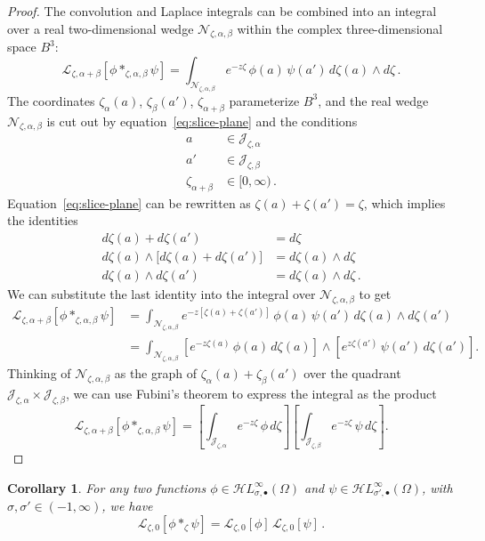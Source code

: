 \documentclass{article}
\newcommand{\singexp}[2]{\mathcal{H}L^\infty_{#1, #2}}
\newcommand{\singexpalg}[1]{\singexp{#1}{\bullet}}
\newcommand{\laplace}{\mathcal{L}}
\theoremstyle{definition}
\theoremstyle{plain}
\newtheorem{corollary}[theorem]{Corollary}
\begin{document}
\begin{proof}
The convolution and Laplace integrals can be combined into an integral over a real two-dimensional wedge $\mathcal{N}_{\zeta, \alpha, \beta}$ within the complex three-dimensional space $B^3$:
\[ \laplace_{\zeta,\alpha+\beta}[{\phi}\ast_{\zeta, \alpha,\beta}{\psi}] = \int_{\mathcal{N}_{\zeta, \alpha, \beta}} e^{-z\zeta}\,\phi(a)\, \psi(a')\,d\zeta(a) \wedge d\zeta\,. \]
The coordinates $\zeta_\alpha(a)$, $\zeta_\beta(a')$, $\zeta_{\alpha+\beta}$ parameterize $B^3$, and the real wedge $\mathcal{N}_{\zeta, \alpha, \beta}$ is cut out by equation~\eqref{eq:slice-plane} and the conditions
\begin{align*}
a & \in \mathcal{J}_{\zeta, \alpha} \\
a' & \in \mathcal{J}_{\zeta, \beta} \\
\zeta_{\alpha+\beta} & \in [0, \infty)\,.
\end{align*}
Equation~\eqref{eq:slice-plane} can be rewritten as $\zeta(a) + \zeta(a') = \zeta$, which implies the identities
\begin{align*}
d\zeta(a) + d\zeta(a') & = d\zeta \\
d\zeta(a) \wedge \big[d\zeta(a) + d\zeta(a')\big] & = d\zeta(a) \wedge d\zeta \\
d\zeta(a) \wedge d\zeta(a') & = d\zeta(a) \wedge d\zeta\,.
\end{align*}
We can substitute the last identity into the integral over $\mathcal{N}_{\zeta, \alpha, \beta}$ to get
\begin{align*}
\laplace_{\zeta,\alpha+\beta}[{\phi}\ast_{\zeta, \alpha,\beta}{\psi}] & = \int_{\mathcal{N}_{\zeta, \alpha, \beta}} e^{-z[\zeta(a) + \zeta(a')]}\,\phi(a)\, \psi(a')\,d\zeta(a) \wedge d\zeta(a') \\
& = \int_{\mathcal{N}_{\zeta, \alpha, \beta}} \left[ e^{-z\zeta(a)}\,\phi(a)\,d\zeta(a) \right] \wedge \left[ e^{z\zeta(a')}\,\psi(a')\,d\zeta(a') \right].
\end{align*}
Thinking of $\mathcal{N}_{\zeta, \alpha, \beta}$ as the graph of $\zeta_\alpha(a) + \zeta_\beta(a')$ over the quadrant $\mathcal{J}_{\zeta, \alpha} \times \mathcal{J}_{\zeta, \beta}$, we can use Fubini's theorem to express the integral as the product
\[ \laplace_{\zeta,\alpha+\beta}[{\phi}\ast_{\zeta, \alpha,\beta}{\psi}] = \left[ \int_{\mathcal{J}_{\zeta, \alpha}} e^{-z\zeta}\,\phi\,d\zeta \right] \left[ \int_{\mathcal{J}_{\zeta,\beta}} e^{-z\zeta}\,\psi\,d\zeta \right]. \]
\end{proof}
%
\begin{corollary}\label{prop:convolution_iso_laplace}
For any two functions $\phi \in \singexpalg{\sigma}(\Omega)$ and $\psi \in \singexpalg{\sigma'}(\Omega)$, with $\sigma, \sigma' \in (-1, \infty)$, we have
\begin{equation}\label{eqn:laplace-convol1}
\laplace_{\zeta,0}[\phi\ast_{\zeta}\psi]=\laplace_{\zeta,0}[\phi]\,\laplace_{\zeta,0}[\psi]\,.
\end{equation}
\end{corollary}
\end{document}
